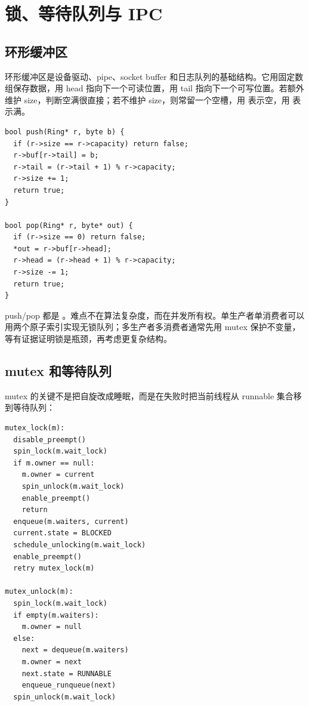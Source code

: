 \section{锁、等待队列与 IPC}

\subsection{环形缓冲区}

环形缓冲区是设备驱动、pipe、socket buffer 和日志队列的基础结构。它用固定数组保存数据，用 head 指向下一个可读位置，用 tail 指向下一个可写位置。若额外维护 size，判断空满很直接；若不维护 size，则常留一个空槽，用  表示空，用  表示满。

\begin{lstlisting}
bool push(Ring* r, byte b) {
  if (r->size == r->capacity) return false;
  r->buf[r->tail] = b;
  r->tail = (r->tail + 1) % r->capacity;
  r->size += 1;
  return true;
}

bool pop(Ring* r, byte* out) {
  if (r->size == 0) return false;
  *out = r->buf[r->head];
  r->head = (r->head + 1) % r->capacity;
  r->size -= 1;
  return true;
}
\end{lstlisting}

push/pop 都是 。难点不在算法复杂度，而在并发所有权。单生产者单消费者可以用两个原子索引实现无锁队列；多生产者多消费者通常先用 mutex 保护不变量，等有证据证明锁是瓶颈，再考虑更复杂结构。

\subsection{mutex 和等待队列}

mutex 的关键不是把自旋改成睡眠，而是在失败时把当前线程从 runnable 集合移到等待队列：

\begin{lstlisting}
mutex_lock(m):
  disable_preempt()
  spin_lock(m.wait_lock)
  if m.owner == null:
    m.owner = current
    spin_unlock(m.wait_lock)
    enable_preempt()
    return
  enqueue(m.waiters, current)
  current.state = BLOCKED
  schedule_unlocking(m.wait_lock)
  enable_preempt()
  retry mutex_lock(m)

mutex_unlock(m):
  spin_lock(m.wait_lock)
  if empty(m.waiters):
    m.owner = null
  else:
    next = dequeue(m.waiters)
    m.owner = next
    next.state = RUNNABLE
    enqueue_runqueue(next)
  spin_unlock(m.wait_lock)
\end{lstlisting}

